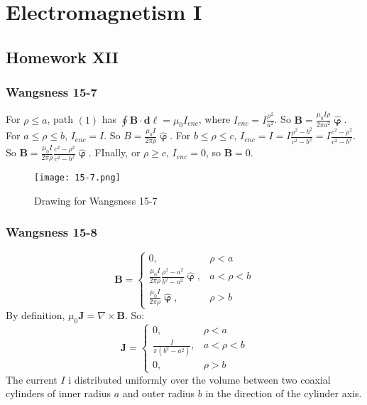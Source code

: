 \documentclass[crop=false,class=article,oneside]{standalone}
\begin{document}
    \ifx\ifsub\undefined
        \section*{Electromagnetism I}
        \setcounter{section}{12}
        \renewcommand\thesubfigure{%
            \arabic{section}.\arabic{figure}.\arabic{subfigure}%
        }
    \fi 
    \subsection{Homework XII}
        \subsubsection{Wangsness 15-7}
        For $\rho\leq a$, path $(1)$ has $\oint \mathbf{B}\cdot \mathbf{d\ell}= \mu_0 I_{enc}$, where $I_{enc} = I\frac{\rho^2}{a^2}$. So $\mathbf{B} = \frac{\mu_0 I\rho}{2\pi a^2} \hat{\boldsymbol{\upvarphi}}$. For $a\leq \rho \leq b$, $I_{enc} = I$. So $B = \frac{\mu_0 I}{2\pi \rho} \hat{\boldsymbol{\upvarphi}}$. For $b\leq \rho \leq c$, $I_{enc} = I =I\frac{\rho^2-b^2}{c^2-b^2} = I\frac{c^2-\rho^2}{c^2-b^2}$. So $\mathbf{B} = \frac{\mu_0 I}{2\pi \rho} \frac{c^2-\rho^2}{c^2-b^2}\hat{\boldsymbol{\upvarphi}}$. FInally, or $\rho \geq c$, $I_{enc} = 0$, so $\mathbf{B} = 0$.
        \begin{figure}[htbp]
            \centering
            {\texttt{[image: 15-7.png]}}
            \caption{Drawing for Wangsness 15-7}
        \end{figure}
        \subsubsection{Wangsness 15-8}
        \begin{equation*}
            \mathbf{B} = \begin{cases} 0, & \rho < a \\ \frac{\mu_0 I}{2\pi \rho}\frac{\rho^2-a^2}{b^2-a^2}\hat{\boldsymbol{\upvarphi}}, & a<\rho < b \\ \frac{\mu_0 I}{2\pi \rho} \hat{\boldsymbol{\upvarphi}}, & \rho>b\end{cases}    
        \end{equation*}
        By definition, $\mu_0 \mathbf{J} = \nabla \times \mathbf{B}$. So:
        \begin{equation*}
            \mathbf{J} = \begin{cases} 0, & \rho<a\\ \frac{I}{\pi(b^2-a^2)}, & a<\rho < b\\ 0, & \rho>b \end{cases}    
        \end{equation*}
        The current $I$ i distributed uniformly over the volume between two coaxial cylinders of inner radius $a$ and outer radius $b$ in the direction of the cylinder axis.
\end{document}
